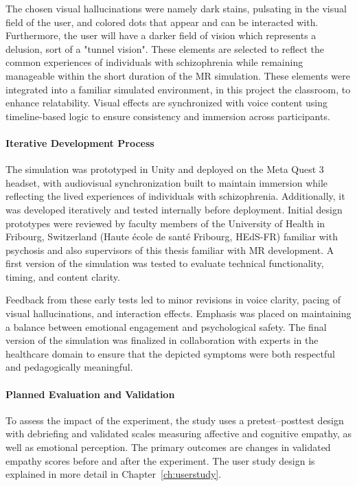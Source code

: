 The chosen visual hallucinations were namely dark stains, pulsating in the visual field of the user, and colored dots that appear and can be interacted with. Furthermore, the user will have a darker field of vision which represents a delusion, sort of a "tunnel vision". These elements are selected to reflect the common experiences of individuals with schizophrenia while remaining manageable within the short duration of the MR simulation.  These elements were integrated into a familiar simulated environment, in this project the classroom, to enhance relatability. Visual effects are synchronized with voice content using timeline-based logic to ensure consistency and immersion across participants.

\paragraph{Iterative Development Process}

The simulation was prototyped in Unity and deployed on the Meta Quest 3 headset, with audiovisual synchronization built to maintain immersion while reflecting the lived experiences of individuals with schizophrenia. Additionally, it was developed iteratively and tested internally before deployment. Initial design prototypes were reviewed by faculty members of the University of Health in Fribourg, Switzerland (Haute école de santé Fribourg, HEdS-FR) familiar with psychosis and also supervisors of this thesis familiar with MR development. A first version of the simulation was tested to evaluate technical functionality, timing, and content clarity.

\vspace{1em}

Feedback from these early tests led to minor revisions in voice clarity, pacing of visual hallucinations, and interaction effects. Emphasis was placed on maintaining a balance between emotional engagement and psychological safety. The final version of the simulation was finalized in collaboration with experts in the healthcare domain to ensure that the depicted symptoms were both respectful and pedagogically meaningful.

\paragraph{Planned Evaluation and Validation}

To assess the impact of the experiment, the study uses a pretest–posttest design with debriefing and validated scales measuring affective and cognitive empathy, as well as emotional perception. The primary outcomes are changes in validated empathy scores before and after the experiment. The user study design is explained in more detail in Chapter~\ref{ch:userstudy}.

